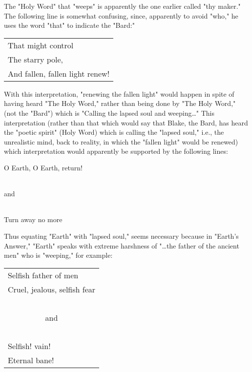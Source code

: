 \newpage
The "Holy Word" that "weeps" is apparently the one earlier called "thy maker." The following line is somewhat confusing,
since, apparently to avoid "who," he uses the word "that" to indicate the "Bard:"\par
\begin{center}
	\begin{tabular}{l}
		That might control \\
		The starry pole,   \\
		And fallen, fallen light renew!
	\end{tabular}
\end{center}
\hspace*{5mm}With this interpretation, "renewing the fallen light" would happen in spite of having heard "The Holy Word," rather
than being done by "The Holy Word," (not the "Bard") which is "Calling the lapsed soul and weeping\dots" This interpretation
(rather than that which would say that Blake, the Bard, has heard the "poetic spirit" (Holy Word) which is calling the "lapsed soul,"
i.e., the unrealistic mind, back to reality, in which the "fallen light" would be renewed) which interpretation would
apparently be supported by the following lines:\par
\begin{center}
	\parbox{0.8\textwidth}{
		\centering
		\hspace*{5mm}O Earth, O Earth, return!\par
		~\\
		\hspace*{5mm}and\par
		~\\
		\hspace*{5mm}Turn away no more\par
	}%
\end{center}
Thus equating "Earth" with "lapsed soul," seems necessary because in "Earth's Answer," "Earth" speaks
with extreme harshness of "\dots the father of the ancient men" who is "weeping," for example:\par
\begin{center}
	\begin{tabular}{l}
		Selfish father of men        \\
		Cruel, jealous, selfish fear \\
		~                            \\
		\multicolumn{1}{c}{and}      \\
		~                            \\
		Selfish! vain!               \\
		Eternal bane!
	\end{tabular}
\end{center}
